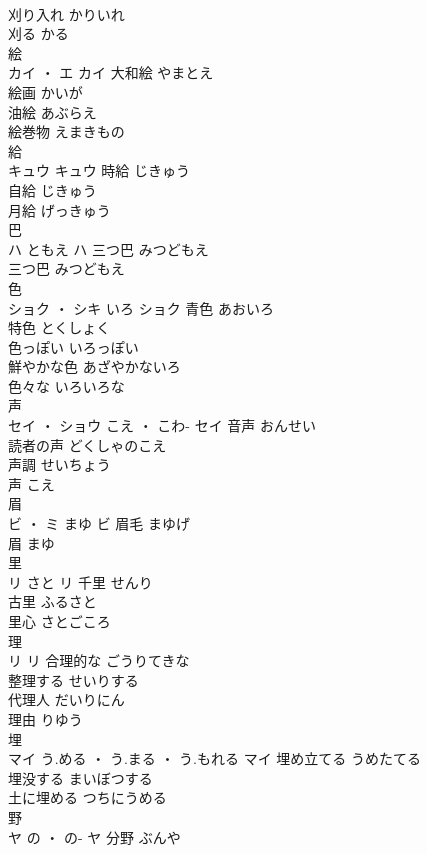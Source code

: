 \documentclass[8pt]{extreport}
\begin{document}
\begin{CJK}{UTF8}{min}
\\	刈り入れ	かりいれ	
\\	刈る	かる	
\\	絵	
\\	カイ ・ エ		カイ	大和絵	やまとえ	
\\	絵画	かいが	
\\	油絵	あぶらえ	
\\	絵巻物	えまきもの	
\\	給	
\\	キュウ		キュウ	時給	じきゅう	
\\	自給	じきゅう	
\\	月給	げっきゅう	
\\	巴	
\\	ハ	ともえ	ハ	三つ巴	みつどもえ	
\\	三つ巴	みつどもえ	
\\	色	
\\	ショク ・ シキ	いろ	ショク	青色	あおいろ	
\\	特色	とくしょく	
\\	色っぽい	いろっぽい	
\\	鮮やかな色	あざやかないろ	
\\	色々な	いろいろな	
\\	声	
\\	セイ ・ ショウ	こえ ・ こわ-	セイ	音声	おんせい	
\\	読者の声	どくしゃのこえ	
\\	声調	せいちょう	
\\	声	こえ	
\\	眉	
\\	ビ ・ ミ	まゆ	ビ	眉毛	まゆげ	
\\	眉	まゆ	
\\	里	
\\	リ	さと	リ	千里	せんり	
\\	古里	ふるさと	
\\	里心	さとごころ	
\\	理	
\\	リ		リ	合理的な	ごうりてきな	
\\	整理する	せいりする	
\\	代理人	だいりにん	
\\	理由	りゆう	
\\	埋	
\\	マイ	う.める ・ う.まる ・ う.もれる	マイ	埋め立てる	うめたてる	
\\	埋没する	まいぼつする	
\\	土に埋める	つちにうめる	
\\	野	
\\	ヤ	の ・ の-	ヤ	分野	ぶんや	

\end{CJK}
\end{document}
